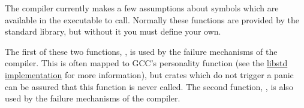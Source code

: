 The compiler currently makes a few assumptions about symbols which are available in the executable to call. Normally 
these functions are provided by the standard library, but without it you must define your own.

\blank

The first of these two functions, , is used by the failure mechanisms of the compiler. This is often 
mapped to GCC's personality function (see the 
\href{https://github.com/rust-lang/rust/blob/master/src/libstd/sys/common/unwind/gcc.rs}{libstd implementation} for more 
information), but crates which do not trigger a panic can be assured that this function is never called. The second function, 
, is also used by the failure mechanisms of the compiler.
